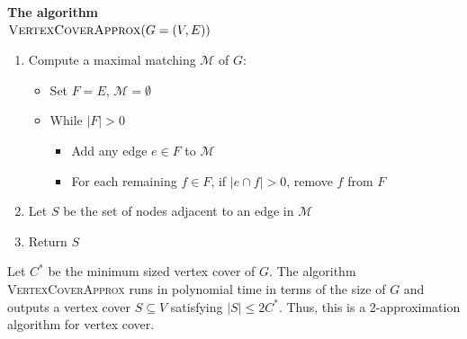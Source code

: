 \documentclass[11  pt]{article}
\begin{document}
	
	\vspace{8cm}
	
	
	\textbf{The algorithm}\\
	
	$\textsc{VertexCoverApprox}(G = (V,E))$
	\begin{enumerate}
		\item Compute a maximal matching $\mathcal{M}$ of $G$:
		\begin{itemize}
			\item Set $F = E$, $\mathcal{M} = \emptyset$
			\item While $|F| > 0$
			\begin{itemize}
				\item Add any edge $e \in F$ to $\mathcal{M}$
				\item For each remaining $f \in F$, if $|e \cap f| > 0$, remove $f$ from $F$
			\end{itemize}
		\end{itemize}
		\item Let $S$ be the set of nodes adjacent to an edge in $\mathcal{M}$
		\item Return $S$\\
	\end{enumerate}
	
	\newpage
	\begin{theorem}
		Let $C^*$ be the minimum sized vertex cover of $G$. The algorithm \textsc{VertexCoverApprox} runs in polynomial time in terms of the size of $G$ and outputs a vertex cover $S \subseteq V$ satisfying $|S| \leq 2C^*$. Thus, this is a 2-approximation algorithm for vertex cover.
	\end{theorem}
\end{document}
